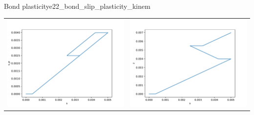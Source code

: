 \documentclass[main.tex]{subfiles}
\begin{document}
\begin{bmcsex}{Bond plasticity}{e22_bond_slip_plasticity_kinem}
\begin{center}
\noindent
\begin{longtable}{L{7.5cm}L{7.5cm}}
\includegraphics[width=7.5cm]{examples/e22_bond_slip_plasticity_kinem/fig_s_p-s.pdf}
 & 
\includegraphics[width=7.5cm]{examples/e22_bond_slip_plasticity_kinem/fig_z-s.pdf}
 \\\end{longtable}
\end{center}
            \end{bmcsex}
\end{document}
